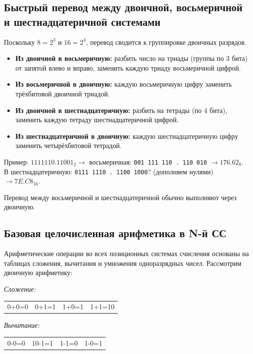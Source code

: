\documentclass[a4paper,14pt]{report}
\begin{document}
\subsection{Быстрый перевод между двоичной, восьмеричной и шестнадцатеричной системами}
Поскольку $8=2^3$ и $16=2^4$, перевод сводится к группировке двоичных разрядов.

\begin{itemize}
    \item \textbf{Из двоичной в восьмеричную:} разбить число на триады (группы по 3 бита) от запятой влево и вправо, заменить каждую триаду восьмеричной цифрой.
    \item \textbf{Из восьмеричной в двоичную:} каждую восьмеричную цифру заменить трёхбитовой двоичной триадой.
    \item \textbf{Из двоичной в шестнадцатеричную:} разбить на тетрады (по 4 бита), заменить каждую тетраду шестнадцатеричной цифрой.
    \item \textbf{Из шестнадцатеричной в двоичную:} каждую шестнадцатеричную цифру заменить четырёхбитовой тетрадой.
\end{itemize}

Пример: $1111110.11001_2 \to$ восьмеричная: \texttt{001 111 110 . 110 010} $\to 176.62_8$.
В шестнадцатеричную: \texttt{0111 1110 . 1100 1000}? (дополняем нулями) $\to 7E.C8_{16}$.

Перевод между восьмеричной и шестнадцатеричной обычно выполняют через двоичную.

\subsection{Базовая целочисленная арифметика в N-й СС}
Арифметические операции во всех позиционных системах счисления основаны на таблицах сложения, вычитания и умножения одноразрядных чисел. Рассмотрим двоичную арифметику:

\textit{Сложение:}
\begin{center}
\begin{tabular}{c|c|c|c}
0+0=0 & 0+1=1 & 1+0=1 & 1+1=10
\end{tabular}
\end{center}

\textit{Вычитание:}
\begin{center}
\begin{tabular}{c|c|c|c}
0-0=0 & 10-1=1 & 1-1=0 & 1-0=1
\end{tabular}
\end{center}
\end{document}
